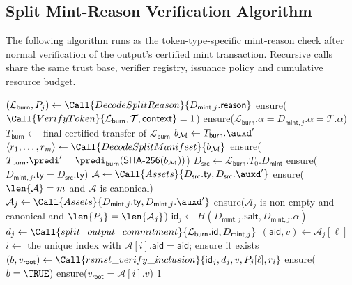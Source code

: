 \subsection{Split Mint-Reason Verification Algorithm}\label{app:split-verification-algorithm}

The following algorithm runs as the token-type-specific mint-reason check after normal verification of the output's certified mint transaction. Recursive calls share the same trust base, verifier registry, issuance policy and cumulative resource budget.

\begin{algorithm}[!htbp]
	\caption{Split Mint-Reason Verification}\label{alg:split-verify}
	\begin{algorithmic}[0]
			\State $(\mathcal{L}_\mathsf{burn},P_j)\gets\Call{DecodeSplitReason}{D_{\mathsf{mint},j}.\mathsf{reason}}$
			\State ensure($\Call{VerifyToken}{\mathcal{L}_\mathsf{burn},\mathcal{T},\mathsf{context}}=1$)
			\State ensure($\mathcal{L}_\mathsf{burn}.\alpha=D_{\mathsf{mint},j}.\alpha=\mathcal{T}.\alpha$)
			\State $T_\mathsf{burn}\gets$ final certified transfer of $\mathcal{L}_\mathsf{burn}$
			\State $b_\mathcal{M}\gets T_\mathsf{burn}.\auxd'$
			\State $\langle r_1,\ldots,r_m\rangle\gets\Call{DecodeSplitManifest}{b_\mathcal{M}}$
			\State ensure($T_\mathsf{burn}.\predi'=\predi_\mathsf{burn}(\mathsf{SHA\text{-}256}(b_\mathcal{M}))$)
			\State $D_\mathsf{src}\gets\mathcal{L}_\mathsf{burn}.T_0.D_\mathsf{mint}$
			\State ensure($D_{\mathsf{mint},j}.\mathsf{ty}=D_\mathsf{src}.\mathsf{ty}$)
			\State $\mathcal{A}\gets\Call{Assets}{D_\mathsf{src}.\mathsf{ty},D_\mathsf{src}.\auxd'}$
			\State ensure($\len{\mathcal{A}}=m$ and $\mathcal{A}$ is canonical)
			\State $\mathcal{A}_j\gets\Call{Assets}{D_{\mathsf{mint},j}.\mathsf{ty},D_{\mathsf{mint},j}.\auxd'}$
			\State ensure($\mathcal{A}_j$ is non-empty and canonical and $\len{P_j}=\len{\mathcal{A}_j}$)
			\State $\mathsf{id}_j\gets H(D_{\mathsf{mint},j}.\mathsf{salt},D_{\mathsf{mint},j}.\alpha)$
			\State $d_j\gets\Call{split\_output\_commitment}{\mathcal{L}_\mathsf{burn}.\mathsf{id},D_{\mathsf{mint},j}}$
				\State $(\mathsf{aid},v)\gets\mathcal{A}_j[\ell]$
				\State $i\gets$ the unique index with $\mathcal{A}[i].\mathsf{aid}=\mathsf{aid}$; ensure it exists
				\State $(b,v_\mathsf{root})\gets\Call{rsmst\_verify\_inclusion}{\mathsf{id}_j,d_j,v,P_j[\ell],r_i}$
				\State ensure($b=\TRUE$)
				\State ensure($v_\mathsf{root}=\mathcal{A}[i].v$)
			\EndFor
			\State \Return $1$
		\EndFunction
	\end{algorithmic}
\end{algorithm}
